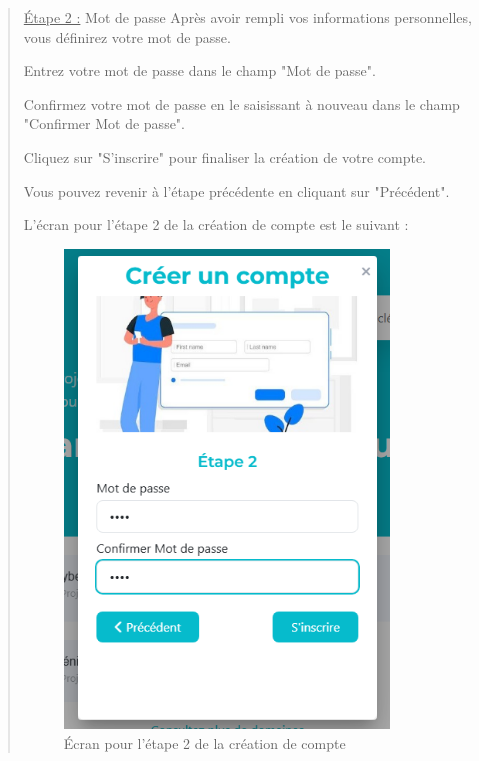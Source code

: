 \documentclass[a4paper,12pt]{article}
\begin{document}
\begin{quote}
\underline{Étape 2 :} Mot de passe Après avoir rempli vos informations personnelles, vous définirez votre mot de passe.

Entrez votre mot de passe dans le champ "Mot de passe".

Confirmez votre mot de passe en le saisissant à nouveau dans le champ "Confirmer Mot de passe".

Cliquez sur "S'inscrire" pour finaliser la création de votre compte.

Vous pouvez revenir à l'étape précédente en cliquant sur "Précédent".

L'écran pour l'étape 2 de la création de compte est le suivant :

\begin{figure}[H]
\centering
\includegraphics[width=0.85\textwidth]{images/creercompte2.png}
\caption{Écran pour l'étape 2 de la création de compte}
\label{fig:etape2}
\end{figure}
\end{quote}
\end{document}
